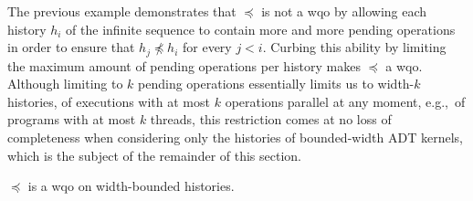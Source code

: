 The previous example demonstrates that $\preceq$ is not a wqo by allowing each
history $h_i$ of the infinite sequence to contain more and more pending
operations in order to ensure that $h_j \not\preceq h_i$ for every $j < i$.
Curbing this ability by limiting the maximum amount of pending operations per
history makes $\preceq$ a wqo. Although limiting to $k$ pending operations
essentially limits us to width-$k$ histories, of executions with at most $k$
operations parallel at any moment, e.g.,~of programs with at most $k$ threads,
this restriction comes at no loss of completeness when considering only the
histories of bounded-width ADT kernels, which is the subject of the remainder
of this section.

\begin{lemma}

  $\preceq$ is a wqo on width-bounded histories.

\end{lemma}

